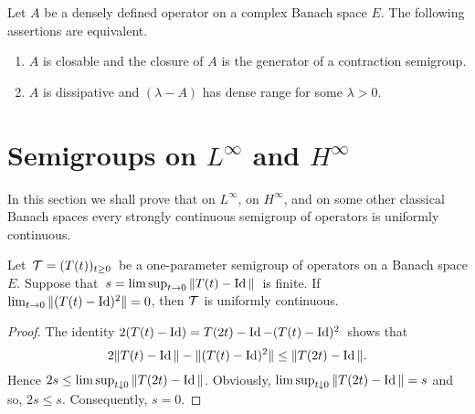 \begin{theorem}\label{thm:a2-2.13}
Let $A$ be a densely defined operator on a complex Banach space $E$.
The following assertions are equivalent.
\begin{enumerate}[\upshape (a)]	
\item \label{thm:a2-2.13.1}
$A$ is closable and the closure of $A$ is the generator of a contraction semigroup.
\item \label{thm:a2-2.13.2}
$A$ is dissipative and $(\lambda - A)$ has dense range for some $\lambda > 0$.
\end{enumerate}
\end{theorem}
\section{Semigroups on \texorpdfstring{$L^{\infty}$}{L-infty}  and \texorpdfstring{$H^{\infty}$}{H-infty} \label{sec:a2-3}}
\hspace{1cm}{\Large by Heinrich P. Lotz}
\vspace{.5cm}
\newline
In this section we shall prove that on $L^\infty$, on $H^\infty$, and on some other classical Banach spaces every strongly continuous semigroup of operators is uniformly continuous.
\begin{lemma}\label{lem:a2-3.1}
Let\, $\mathcal{T} = (T(t))_{t\geq 0}$\, be a one-parameter semigroup of operators on a Banach space $E$.
Suppose that\, $s = \lim\sup_{t\to 0} \|T(t) - \operatorname{Id}\|$\, is finite.
If  $\lim_{t\to 0} \|(T(t) - \operatorname{Id})^2\| = 0$, then $\mathcal{T}$ is uniformly continuous.
\end{lemma}
\begin{proof}
The identity  $2(T(t) - \operatorname{Id}) = T(2t) - \operatorname{Id} - (T(t) - \operatorname{Id})^2$\, shows that
\[
	2\|T(t) - \operatorname{Id}\| - \|(T(t) - \operatorname{Id})^{2} \| \leq \|T(2t) - \operatorname{Id}\| .
\]
Hence $2s \leq \lim \sup_{t \downarrow 0} \|T(2t) - \operatorname{Id}\|$.
Obviously, $\lim \sup_{t \downarrow 0} \|T(2t) - \operatorname{Id}\| = s$ and so, $2s \leq s$.
Consequently, $s = 0$.
\end{proof}
